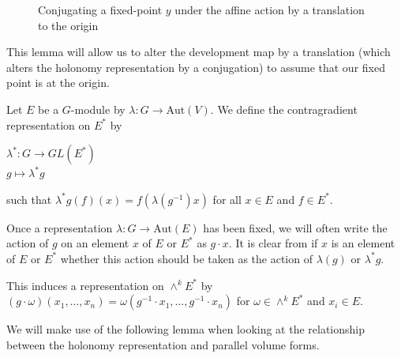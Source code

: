 \begin{figure}[H]
    \centering
    \caption{Conjugating a fixed-point $y$ under the affine action by a translation to the origin}
\end{figure}

\begin{remark}
    This lemma will allow us to alter the development map by a translation (which
    alters the holonomy representation by a conjugation) to assume that our fixed
    point is at the origin.
\end{remark}

\begin{definition}
    Let $E$ be a $G$-module by $\lambda: G \to \text{Aut}(V)$. We define
    the contragradient representation on $E^*$ by
    \begin{center}
        $\lambda^*: G \to GL(E^*)$\\
        $g \mapsto \lambda^* g$
    \end{center}
    such that $\lambda^*g(f)(x) = f(\lambda(g^{-1})x)$ for all $x \in E$ and $f\in E^*$.
\end{definition}
\begin{remark}
    Once a representation $\lambda: G \to \text{Aut}(E)$ has been fixed, we will often write the action of $g$ on an element $x$ of $E$ or $E^*$ as
    $g \cdot x$. It is clear from if $x$ is an element of $E$ or $E^*$ whether this action should be taken as the action of $\lambda(g)$ or $\lambda^*g$.
\end{remark}
\begin{remark}
    This induces a representation on $\wedge^kE^*$ by \\$(g\cdot \omega)(x_1, \dots , x_n) = \omega(g^{-1}\cdot x_1, \dots, g^{-1}\cdot x_n)$ for $\omega \in \wedge^k E^*$
        and $x_i \in E$.
\end{remark}

We will make use of the following lemma when looking at the relationship
between the holonomy representation and parallel volume forms.

